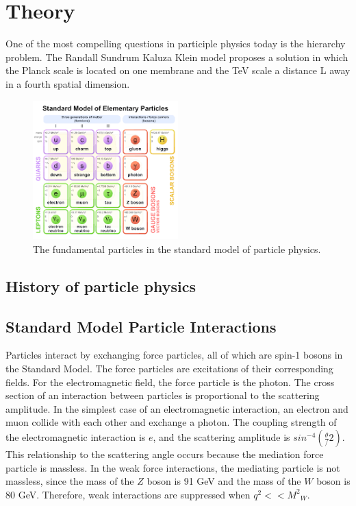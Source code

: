 \chapter{Theory}\label{chap:cms}


One of the most compelling questions in participle physics today is the hierarchy problem. The Randall Sundrum Kaluza Klein model proposes a solution in which the Planck scale is located on one membrane and the TeV scale a distance L away in a fourth spatial dimension. 

\begin{figure}[h]
	\centering
	\includegraphics[width=0.5\textwidth]{figures/sm_blocks.png}
	\caption{The fundamental particles in the standard model of particle physics.}
	\label{fig:sm}
\end{figure}
\clearpage

\section{History of particle physics}

\newpage

\section{Standard Model Particle Interactions}

\newpage




Particles interact by exchanging force particles, all of which are spin-1 bosons in the Standard Model. The force particles are excitations of their corresponding fields. For the electromagnetic field, the force particle is the photon. The cross section of an interaction between particles is proportional to the scattering amplitude. In the simplest case of an electromagnetic interaction, an electron and muon collide with each other and exchange a photon. The coupling strength of the electromagnetic interaction is $e$, and the scattering amplitude is $sin^{-4}(\frac{\theta}/{2})$. This relationship to the scattering angle occurs because the mediation force particle is massless. In the weak force interactions, the mediating particle is not massless, since the mass of the $Z$ boson is 91 GeV and the mass of the $W$ boson is 80 GeV. Therefore, weak interactions are suppressed when $q^2 << {M^{2}}_{W}$.

